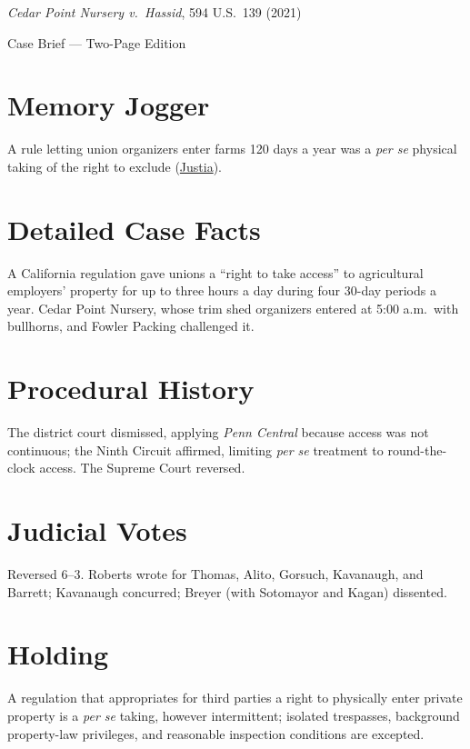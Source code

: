 \documentclass[12pt]{article}
\begin{document}
\begin{center}
{\LARGE \textit{Cedar Point Nursery v.\ Hassid}, 594 U.S.\ 139 (2021)\par}
\vspace{0.5em}
{\large Case Brief --- Two-Page Edition\par}
\end{center}

\section{Memory Jogger}
A rule letting union organizers enter farms 120 days a year was a \emph{per se} physical taking of the right to exclude (\href{https://supreme.justia.com/cases/federal/us/594/20-107/}{Justia}).

\section{Detailed Case Facts}
A California regulation gave unions a ``right to take access'' to agricultural employers' property for up to three hours a day during four 30-day periods a year. Cedar Point Nursery, whose trim shed organizers entered at 5:00 a.m.\ with bullhorns, and Fowler Packing challenged it.

\section{Procedural History}
The district court dismissed, applying \textit{Penn Central} because access was not continuous; the Ninth Circuit affirmed, limiting \emph{per se} treatment to round-the-clock access. The Supreme Court reversed.

\section{Judicial Votes}
Reversed 6--3. Roberts wrote for Thomas, Alito, Gorsuch, Kavanaugh, and Barrett; Kavanaugh concurred; Breyer (with Sotomayor and Kagan) dissented.

\section{Holding}
A regulation that appropriates for third parties a right to physically enter private property is a \emph{per se} taking, however intermittent; isolated trespasses, background property-law privileges, and reasonable inspection conditions are excepted.
\end{document}
